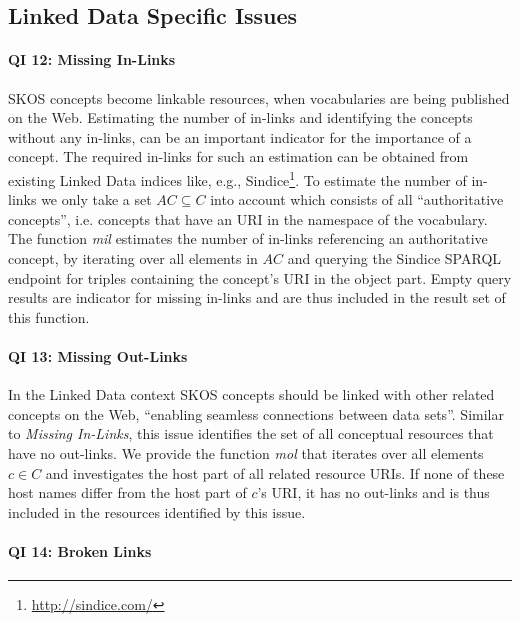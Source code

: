 
\subsection{Linked Data Specific Issues}

\paragraph{QI 12: Missing In-Links}

SKOS concepts become linkable resources, when vocabularies are being published on the Web. Estimating the number of in-links and identifying the concepts without any in-links, can be an important indicator for the importance of a concept. The required in-links for such an estimation can be obtained from existing Linked Data indices like, e.g., Sindice\footnote{\url{http://sindice.com/}}. 
To estimate the number of in-links we only take a set $AC \subseteq C$ into account which consists of all ``authoritative concepts'', i.e. concepts that have an URI in the namespace of the vocabulary. The function \textit{mil} estimates the number of in-links referencing an authoritative concept, by iterating over all elements in $AC$ and querying the Sindice SPARQL endpoint for triples containing the concept's URI in the object part. Empty query results are indicator for missing in-links and are thus included in the result set of this function.

\paragraph{QI 13: Missing Out-Links}

In the Linked Data context SKOS concepts should be linked with other related concepts on the Web, ``enabling seamless connections between data sets''\cite{Heath2011}. Similar to \emph{Missing In-Links}, this issue identifies the set of all conceptual resources that have no out-links. 
We provide the function \textit{mol} that iterates over all elements $c \in C$ and investigates the host part of all related resource URIs. If none of these host names differ from the host part of $c$'s URI, it has no out-links and is thus included in the resources identified by this issue.

\paragraph{QI 14: Broken Links}

